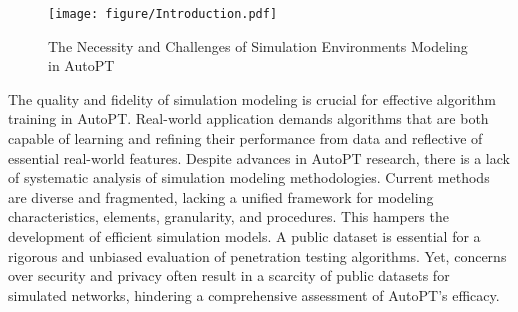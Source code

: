 \begin{figure*}[tb]
    \centering
    \texttt{[image: figure/Introduction.pdf]}
    \caption{The Necessity and Challenges of Simulation Environments Modeling in AutoPT}
    \label{Introduction}
\end{figure*}

The quality and fidelity of simulation modeling is crucial for effective algorithm training in AutoPT. Real-world application demands algorithms that are both capable of learning and refining their performance from data and reflective of essential real-world features. 
Despite advances in AutoPT research, there is a lack of systematic analysis of simulation modeling methodologies. 
Current methods are diverse and fragmented, lacking a unified framework for modeling characteristics, elements, granularity, and procedures.  This hampers the development of efficient simulation models. 
A public dataset is essential for a rigorous and unbiased evaluation of penetration testing algorithms. Yet, concerns over security and privacy often result in a scarcity of public datasets for simulated networks, hindering a comprehensive assessment of AutoPT's efficacy.


